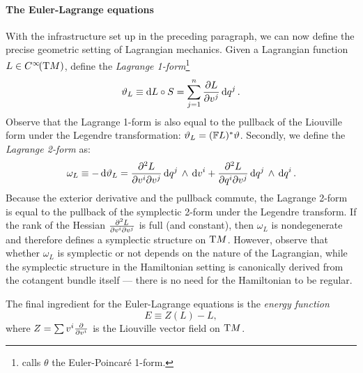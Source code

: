 \paragraph{The Euler-Lagrange equations} With the infrastructure set up in the preceding paragraph, we can now define the precise geometric setting of Lagrangian mechanics. Given a Lagrangian function $L \in C^\infty\!\qty(\mathrm{T}M)$, define the \emph{Lagrange 1-form}\footnote
{\citet{Carinena1990} calls $\theta$ the Euler-Poincaré 1-form.}
\begin{equation}
    \vartheta_L \equiv \dd{L} \circ S = \sum_{j=1}^n \pdv{L}{v^j}\dd{q^j}.
\end{equation}
Observe that the Lagrange 1-form is also equal to the pullback of the Liouville form under the Legendre transformation: $\vartheta_L = (\mathbb{F}L)^* \vartheta$. \cite{Abraham1978}
Secondly, we define the \emph{Lagrange 2-form} as: \cite{Abraham1978,Carinena1990}
\begin{equation}
    \omega_L \equiv - \dd{\vartheta}_L = \pdv[2]{L}{v^i}{v^j} \dd{q^j}\,\wedge\,\dd{v^i}  + \pdv[2]{L}{q^i}{v^j} \dd{q^j}\,\wedge\,\dd{q^i} .
\end{equation}
Because the exterior derivative and the pullback commute, the Lagrange 2-form is equal to the pullback of the symplectic 2-form under the Legendre transform. If the rank of the Hessian $ \pdv[2]{L}{v^i}{v^j}$ is full (and constant), then $\omega_L$ is nondegenerate and therefore defines a symplectic structure on $\mathrm{T}M$. However, observe that whether $\omega_L$ is symplectic or not depends on the nature of the Lagrangian, while the symplectic structure in the Hamiltonian setting is canonically derived from the cotangent bundle itself --- there is no need for the Hamiltonian to be regular.

The final ingredient for the Euler-Lagrange equations is the \emph{energy function}
$$ E \equiv Z(L) - L, $$
where $Z = \sum v^i \pdv{}{v^i}$ is the Liouville vector field on $\mathrm{T}M$.


